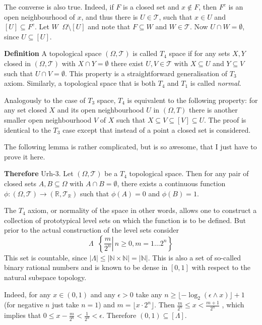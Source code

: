 \documentclass[a4paper]{article}
\newcommand{\obj}[1]{\left\{ #1 \right \}}
\newcommand{\clo}[1]{\left [ #1 \right ]}
\newcommand{\brac}[1]{\left ( #1 \right )}
\newcommand{\induc}[1]{\left . #1 \right \vert}
\newcommand{\abs}[1]{\left | #1 \right |}
\newcommand{\Real}{\mathbb{R}}
\newcommand{\Tcal}{\mathcal{T}}
\newcommand{\defn}{\mathop{\overset{\Delta}{=}}\nolimits}
\begin{document}
The converse is also true. Indeed, if $F$ is a closed set and $x\notin F$, then $F^c$ is an open neighbourhood of $x$, and thus there is $U\in \Tcal$, such that $x\in U$ and $\clo{U}\subseteq F^c$. Let $W\defn \Omega\setminus \clo{U}$ and note that $F\subseteq W$ and $W\in \Tcal$. Now $U\cap W = \emptyset$, since $U\subseteq \clo{U}$.

\noindent \textbf{Definition}
A topological space $\brac{\Omega, \Tcal}$ is called $T_4$ space if for any sets $X, Y$ closed in $\brac{\Omega, \Tcal}$ with $X\cap Y=\emptyset$ there exist $U,V\in \Tcal$ with $X\subseteq U$ and $Y\subseteq V$ such that $U\cap V = \emptyset$. This property is a straightforward generalisation of $T_3$ axiom. Similarly, a topological space that is both $T_4$ and $T_1$ is called \emph{normal}.

Analogously to the case of $T_3$ space, $T_4$ is equivalent to the following property: for any set closed $X$ and its open neighbourhood $U$ in $\brac{\Omega, T}$ there is another smaller open neighbourhood $V$ of $X$ such that $X\subseteq V\subseteq \clo{V}\subseteq U$. The proof is identical to the $T_3$ case except that instead of a point a closed set is considered.

The following lemma is rather complicated, but is so awesome, that I just have to prove it here.

\label{thm:urysohn} \noindent \textbf{Therefore} Urh-3.
Let $\brac{\Omega,\Tcal}$ be a $T_4$ topological space. Then for any pair of closed sets $A,B\subseteq \Omega$ with $A\cap B = \emptyset$, there exists a continuous function $\phi:\brac{\Omega, \Tcal}\to\brac{\Real,\Tcal_\Real}$ such that $\phi\brac{A}=0$ and $\phi\brac{B}=1$.

The $T_4$ axiom, or normality of the space in other words, allows one to construct a collection of prototypical level sets on which the function is to be defined. But prior to the actual construction of the level sets consider \[\Lambda\defn\obj{ \induc{\frac{m}{2^n}}\, n\geq 0, m = 1\ldots 2^n}\] This set is countable, since $\abs{\Lambda} \leq \abs{\mathbb{N}\times\mathbb{N}} = \abs{\mathbb{N}}$. This is also a set of so-called binary rational numbers and is known to be dense in $\clo{0,1}$ with respect to the natural subspace topology.

Indeed, for any $x \in \brac{0,1}$ and any $\epsilon>0$ take any $n \geq \lfloor -\log_2 \brac{\epsilon\wedge x} \rfloor + 1$ (for negative $n$ just take $n=1$) and $m = \lfloor x \cdot 2^n \rfloor$. Then $\frac{m}{2^n} \leq x < \frac{m+1}{2^n}$ , which implies that $0\leq x - \frac{m}{2^n} < \frac{1}{2^n} < \epsilon$. Therefore $\brac{0,1}\subseteq \clo{\Lambda}$.
\end{document}
